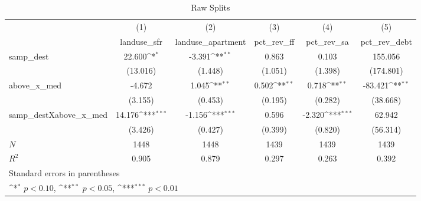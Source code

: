 \begin{table}[htbp]\centering
\def\sym#1{\ifmmode^{#1}\else\(^{#1}\)\fi}
\caption{Raw Splits}
\begin{tabular}{l*{5}{c}}
\hline\hline
            &\multicolumn{1}{c}{(1)}&\multicolumn{1}{c}{(2)}&\multicolumn{1}{c}{(3)}&\multicolumn{1}{c}{(4)}&\multicolumn{1}{c}{(5)}\\
            &\multicolumn{1}{c}{landuse\_sfr}&\multicolumn{1}{c}{landuse\_apartment}&\multicolumn{1}{c}{pct\_rev\_ff}&\multicolumn{1}{c}{pct\_rev\_sa}&\multicolumn{1}{c}{pct\_rev\_debt}\\
\hline
samp\_dest   &      22.600\sym{*}  &      -3.391\sym{**} &       0.863         &       0.103         &     155.056         \\
            &    (13.016)         &     (1.448)         &     (1.051)         &     (1.398)         &   (174.801)         \\
[1em]
above\_x\_med &      -4.672         &       1.045\sym{**} &       0.502\sym{**} &       0.718\sym{**} &     -83.421\sym{**} \\
            &     (3.155)         &     (0.453)         &     (0.195)         &     (0.282)         &    (38.668)         \\
[1em]
samp\_destXabove\_x\_med&      14.176\sym{***}&      -1.156\sym{***}&       0.596         &      -2.320\sym{***}&      62.942         \\
            &     (3.426)         &     (0.427)         &     (0.399)         &     (0.820)         &    (56.314)         \\
\hline
\(N\)       &        1448         &        1448         &        1439         &        1439         &        1439         \\
\(R^{2}\)   &       0.905         &       0.879         &       0.297         &       0.263         &       0.392         \\
\hline\hline
\multicolumn{6}{l}{\footnotesize Standard errors in parentheses}\\
\multicolumn{6}{l}{\footnotesize \sym{*} \(p<0.10\), \sym{**} \(p<0.05\), \sym{***} \(p<0.01\)}\\
\end{tabular}
\end{table}
